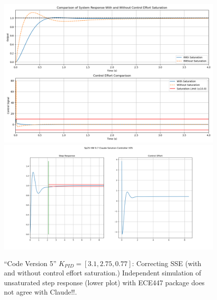 \documentclass{article}
\begin{document}
\begin{figure}\centering
\includegraphics[height=0.6\textwidth]{figsapdx/M47G20cl.png}
\includegraphics[height=0.6\textwidth]{figsapdx/M47G20.png}
\caption{``Code Version 5'' $K_{PID} = [3.1, 2.75, 0.77]$: Correcting SSE (with and without
control effort saturation.)   Independent simulation of unsaturated step response (lower plot)
with ECE447 package does not agree with Claude!!.}
\end{figure}
\end{document}
